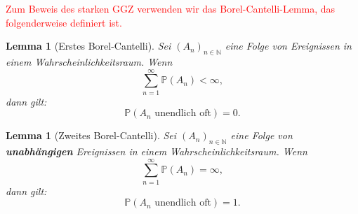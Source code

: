 \documentclass[aodsor,preprint]{imsart}
\numberwithin{equation}{section}
\theoremstyle{plain}
\newtheorem{lemma}[thm]{Lemma}
\begin{document}
\textcolor{red}{
Zum Beweis des starken GGZ verwenden wir das Borel-Cantelli-Lemma, das folgenderweise definiert ist.
}

\begin{lemma}[Erstes Borel-Cantelli]
Sei \( (A_n)_{n \in \mathbb{N}} \) eine Folge von Ereignissen in einem Wahrscheinlichkeitsraum. Wenn
\[
\sum_{n=1}^\infty \mathbb{P}(A_n) < \infty,
\]
dann gilt:
\[
\mathbb{P}(A_n \text{ unendlich oft}) = 0.
\]
\end{lemma}

\begin{lemma}[Zweites Borel-Cantelli]
Sei \( (A_n)_{n \in \mathbb{N}} \) eine Folge von \textbf{unabhängigen} Ereignissen in einem Wahrscheinlichkeitsraum. Wenn
\[
\sum_{n=1}^\infty \mathbb{P}(A_n) = \infty,
\]
dann gilt:
\[
\mathbb{P}(A_n \text{ unendlich oft}) = 1.
\]
\end{lemma}
\end{document}
